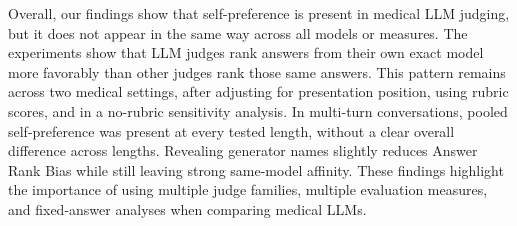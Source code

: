 \documentclass[11pt]{article}
\begin{document}
Overall, our findings show that self-preference is present in medical LLM judging, but it does not appear in the same way across all models or measures. The experiments show that LLM judges rank answers from their own exact model more favorably than other judges rank those same answers. This pattern remains across two medical settings, after adjusting for presentation position, using rubric scores, and in a no-rubric sensitivity analysis. In multi-turn conversations, pooled self-preference was present at every tested length, without a clear overall difference across lengths. Revealing generator names slightly reduces Answer Rank Bias while still leaving strong same-model affinity. These findings highlight the importance of using multiple judge families, multiple evaluation measures, and fixed-answer analyses when comparing medical LLMs.




\end{document}
